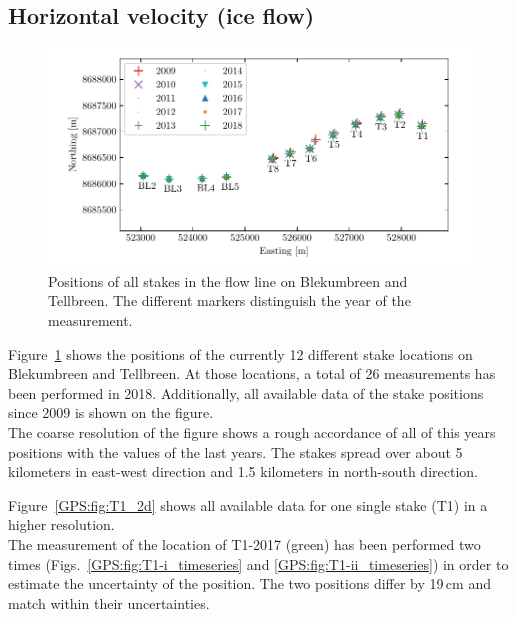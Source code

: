 \subsection{Horizontal velocity (ice flow)}

\begin{figure}[H]
    \centering
    \includegraphics[width=\textwidth]{./figs/stakePositions.pdf}
    \caption{Positions of all stakes in the flow line on Blekumbreen and Tellbreen.
    The different markers distinguish the year of the measurement.}
    \label{GPS:fig:stakepos}
\end{figure}

Figure~\ref{GPS:fig:stakepos} shows the positions of the currently 12 different stake locations
on Blekumbreen and Tellbreen.
At those locations, a total of 26 measurements has been performed in 2018.
Additionally, all available data of the stake positions since 2009 is shown on the figure.\\
The coarse resolution of the figure shows a rough accordance of all of this years positions with the values 
of the last years.
The stakes spread over about 5 kilometers in east-west direction and 1.5 kilometers in north-south direction.

Figure~\ref{GPS:fig:T1_2d} shows all available data for one single stake (T1) in a higher resolution.\\
The measurement of the location of T1-2017 (green) has been performed two times
(Figs.~\ref{GPS:fig:T1-i_timeseries} and \ref{GPS:fig:T1-ii_timeseries})
in order to estimate the uncertainty
of the position.
The two positions differ by 19\,cm and match within their uncertainties.

